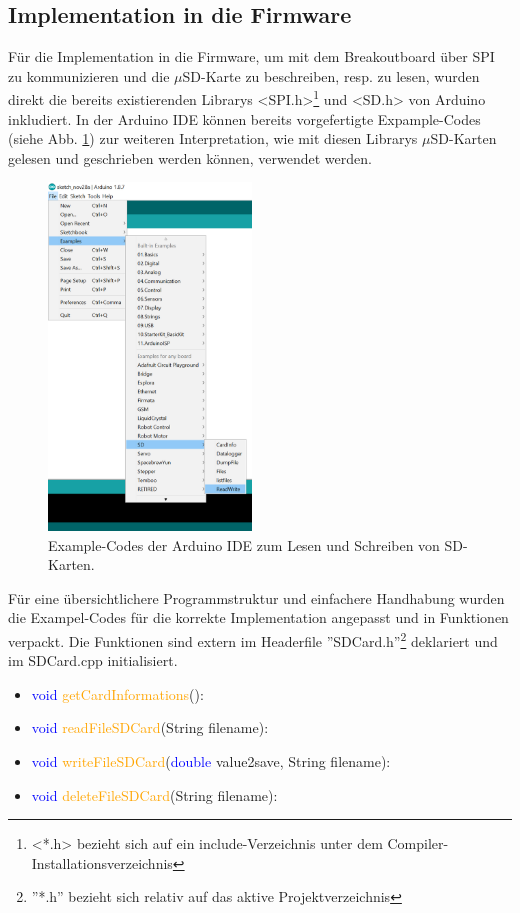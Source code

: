 \subsection{Implementation in die Firmware}
Für die Implementation in die Firmware, um mit dem Breakoutboard über SPI zu kommunizieren und die $\mu$SD-Karte zu beschreiben, resp. zu lesen, wurden direkt die bereits existierenden Librarys <SPI.h>\footnote{ <*.h> bezieht sich auf ein include-Verzeichnis unter dem Compiler-Installationsverzeichnis} und <SD.h> von Arduino inkludiert. In der Arduino IDE können bereits vorgefertigte Expample-Codes (siehe Abb. \ref{fig:exampleCodes}) zur weiteren Interpretation, wie mit diesen Librarys $\mu$SD-Karten gelesen und geschrieben werden können, verwendet werden.\\
\begin{figure}[h]
\centering
\includegraphics[width=0.48\textwidth]{graphics/Datenspeicherung/read_write_examples.PNG}
\caption{Example-Codes der Arduino IDE zum Lesen und Schreiben von SD-Karten.}
\label{fig:exampleCodes}
\end{figure}

Für eine übersichtlichere Programmstruktur und einfachere Handhabung wurden die Exampel-Codes für die korrekte Implementation angepasst und in Funktionen verpackt. Die Funktionen sind extern im Headerfile ''SDCard.h''\footnote{ ''*.h'' bezieht sich relativ auf das aktive Projektverzeichnis} deklariert und im SDCard.cpp initialisiert.
\begin{itemize}
\item \textcolor{blue}{void} \textcolor{orange}{getCardInformations}():
\item \textcolor{blue}{void} \textcolor{orange}{readFileSDCard}(\textcolor{Dandelion}{String} filename): 
\item \textcolor{blue}{void} \textcolor{orange}{writeFileSDCard}(\textcolor{blue}{double} value2save, \textcolor{Dandelion}{String} filename): 
\item \textcolor{blue}{void} \textcolor{orange}{deleteFileSDCard}(\textcolor{Dandelion}{String} filename): 
\end{itemize}
